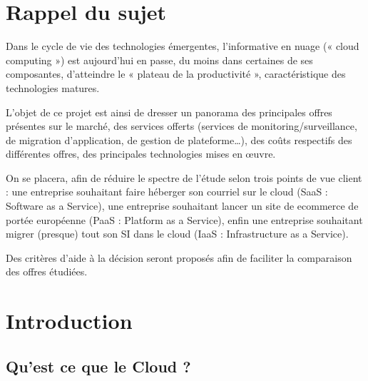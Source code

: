 \documentclass[11pt]{book}
\begin{document}
\mdxtitleblockstart{}
\mdxauthorstart{}
\mdxauthorend\mdxtitleblockend%

\section{Rappel du sujet}\label{sec-rappel-du-sujet}%

\noindent{}Dans le cycle de vie des technologies émergentes, l’informative en nuage (« cloud computing ») est aujourd’hui en
passe, du moins dans certaines de ses composantes, d’atteindre le « plateau de la productivité », caractéristique des
technologies matures.%

L’objet de ce projet est ainsi de dresser un panorama des principales offres présentes sur le marché, des services
offerts (services de monitoring/surveillance, de migration d’application, de gestion de plateforme\dots{}), des coûts respectifs
des différentes offres, des principales technologies mises en œuvre.%

On se placera, afin de réduire le spectre de l’étude selon trois points de vue client : une entreprise souhaitant faire
héberger son courriel sur le cloud (SaaS : Software as a Service), une entreprise souhaitant lancer un site de ecommerce de portée européenne (PaaS : Platform as a Service), enfin une entreprise souhaitant migrer (presque) tout
son SI dans le cloud (IaaS : Infrastructure as a Service).%

Des critères d’aide à la décision seront proposés afin de faciliter la comparaison des offres étudiées.%

\section{Introduction}\label{sec-introduction}%

\subsection{Qu'est ce que le Cloud ?}\label{sec-quest-ce-que-le-cloud-}%
\end{document}
